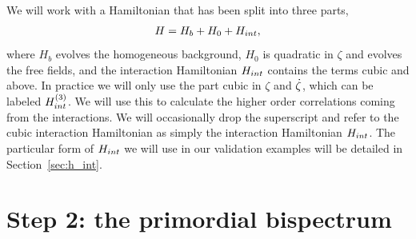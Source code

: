    We will work with a Hamiltonian that has been split into three parts,
    \begin{align}
        H = H_b + H_0 + H_{int},
    \end{align}
    where $H_b$ evolves the homogeneous background, $H_0$ is quadratic in $\zeta$ and evolves the free
    fields, and the interaction Hamiltonian $H_{int}$ contains the terms cubic and above.
    In practice we will only use the part cubic in $\zeta$ and $\dot{\zeta}$,
    which can be labeled $H_{int}^{(3)}$. We will use this to calculate
    the higher order correlations coming from the interactions. We will occasionally drop the superscript and
    refer to the cubic interaction Hamiltonian as simply the interaction Hamiltonian $H_{int}$.
    The particular form of $H_{int}$ we will use in our validation examples will be
    detailed in Section~\ref{sec:h_int}.


    \section{Step 2: the primordial bispectrum}\label{sec:inin_calc_example}
